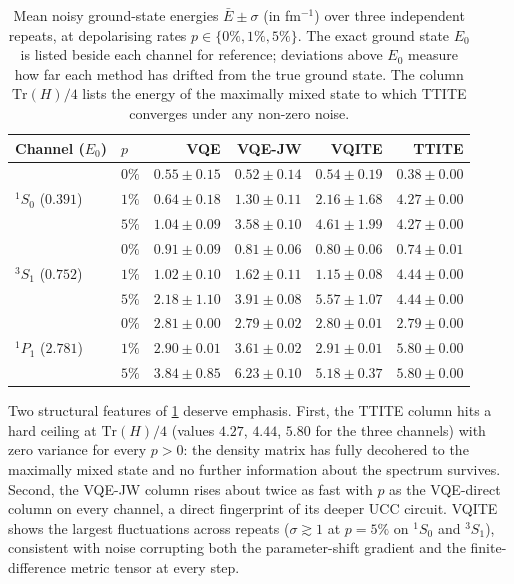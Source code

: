 \begin{table}[htbp]
\centering
\caption{Mean noisy ground-state energies $\bar{E} \pm \sigma$ (in
  fm$^{-1}$) over three independent repeats, at depolarising rates
  $p \in \{0\%, 1\%, 5\%\}$. The exact ground state $E_0$ is listed
  beside each channel for reference; deviations above $E_0$ measure how
  far each method has drifted from the true ground state. The column
  $\mathrm{Tr}(H)/4$ lists the energy of the maximally mixed state to
  which TTITE converges under any non-zero noise.}
\label{tab:noise-energies}
\renewcommand{\arraystretch}{1.15}
\small
\begin{tabular}{llrrrr}
\toprule
Channel ($E_0$) & $p$ & VQE & VQE-JW & VQITE & TTITE \\
\midrule
\multirow{3}{*}{${}^1S_0$ ($0.391$)}
  & $0\%$ & $0.55 \pm 0.15$ & $0.52 \pm 0.14$ & $0.54 \pm 0.19$ & $0.38 \pm 0.00$ \\
  & $1\%$ & $0.64 \pm 0.18$ & $1.30 \pm 0.11$ & $2.16 \pm 1.68$ & $4.27 \pm 0.00$ \\
  & $5\%$ & $1.04 \pm 0.09$ & $3.58 \pm 0.10$ & $4.61 \pm 1.99$ & $4.27 \pm 0.00$ \\
\midrule
\multirow{3}{*}{${}^3S_1$ ($0.752$)}
  & $0\%$ & $0.91 \pm 0.09$ & $0.81 \pm 0.06$ & $0.80 \pm 0.06$ & $0.74 \pm 0.01$ \\
  & $1\%$ & $1.02 \pm 0.10$ & $1.62 \pm 0.11$ & $1.15 \pm 0.08$ & $4.44 \pm 0.00$ \\
  & $5\%$ & $2.18 \pm 1.10$ & $3.91 \pm 0.08$ & $5.57 \pm 1.07$ & $4.44 \pm 0.00$ \\
\midrule
\multirow{3}{*}{${}^1P_1$ ($2.781$)}
  & $0\%$ & $2.81 \pm 0.00$ & $2.79 \pm 0.02$ & $2.80 \pm 0.01$ & $2.79 \pm 0.00$ \\
  & $1\%$ & $2.90 \pm 0.01$ & $3.61 \pm 0.02$ & $2.91 \pm 0.01$ & $5.80 \pm 0.00$ \\
  & $5\%$ & $3.84 \pm 0.85$ & $6.23 \pm 0.10$ & $5.18 \pm 0.37$ & $5.80 \pm 0.00$ \\
\bottomrule
\end{tabular}
\end{table}

Two structural features of \cref{tab:noise-energies} deserve emphasis.
First, the TTITE column hits a hard ceiling at $\mathrm{Tr}(H)/4$
(values $4.27$, $4.44$, $5.80$ for the three channels) with zero
variance for every $p > 0$: the density matrix has fully decohered to
the maximally mixed state and no further information about the
spectrum survives. Second, the VQE-JW column rises about twice as fast
with $p$ as the VQE-direct column on every channel, a direct
fingerprint of its deeper UCC circuit. VQITE shows the largest
fluctuations across repeats ($\sigma \gtrsim 1$ at $p = 5\%$ on
${}^1S_0$ and ${}^3S_1$), consistent with noise corrupting both the
parameter-shift gradient and the finite-difference metric tensor at
every step.

